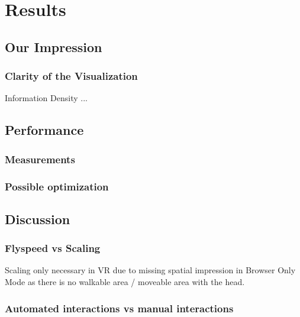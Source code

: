 \chapter{Results}

\section{Our Impression}

\subsection{Clarity of the Visualization}
Information Density ...

\section{Performance}

\subsection{Measurements}
\subsection{Possible optimization}

\section{Discussion}

\subsection{Flyspeed vs Scaling}
Scaling only necessary in VR due to missing 
spatial impression in Browser Only Mode as there is no walkable area / moveable area with the head.

\subsection{Automated interactions vs manual interactions}